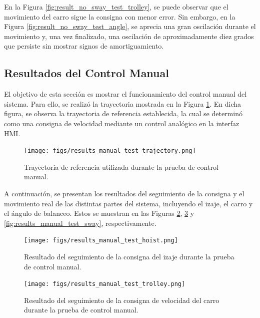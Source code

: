 \documentclass{article}
\begin{document}
            En la Figura \ref{fig:result_no_sway_test_trolley}, se puede observar que el movimiento del carro sigue la consigna con menor error. Sin embargo, en la Figura \ref{fig:result_no_sway_test_angle}, se aprecia una gran oscilación durante el movimiento y, una vez finalizado, una oscilación de aproximadamente diez grados que persiste sin mostrar signos de amortiguamiento.

            

            
            \subsection{Resultados del Control Manual}

            El objetivo de esta sección es mostrar el funcionamiento del control manual del sistema. Para ello, se realizó la trayectoria mostrada en la Figura \ref{fig:results_manual_test_trajectory}. En dicha figura, se observa la trayectoria de referencia establecida, la cual se determinó como una consigna de velocidad mediante un control analógico en la interfaz HMI.

            \begin{figure} [H]
                \centering
                \texttt{[image: figs/results\_manual\_test\_trajectory.png]}
                \caption{Trayectoria de referencia utilizada durante la prueba de control manual.}
                \label{fig:results_manual_test_trajectory}
            \end{figure}

            A continuación, se presentan los resultados del seguimiento de la consigna y el movimiento real de las distintas partes del sistema, incluyendo el izaje, el carro y el ángulo de balanceo. Estos se muestran en las Figuras \ref{fig:results_manual_test_hoist}, \ref{fig:results_manual_test_trolley} y \ref{fig:results_manual_test_sway}, respectivamente.

            \begin{figure} [H]
                \centering
                \texttt{[image: figs/results\_manual\_test\_hoist.png]}
                \caption{Resultado del seguimiento de la consigna del izaje durante la prueba de control manual.}
                \label{fig:results_manual_test_hoist}
            \end{figure}

            \begin{figure} [H]
                \centering
                \texttt{[image: figs/results\_manual\_test\_trolley.png]}
                \caption{Resultado del seguimiento de la consigna de velocidad del carro durante la prueba de control manual.}
                \label{fig:results_manual_test_trolley}
            \end{figure}
\end{document}
